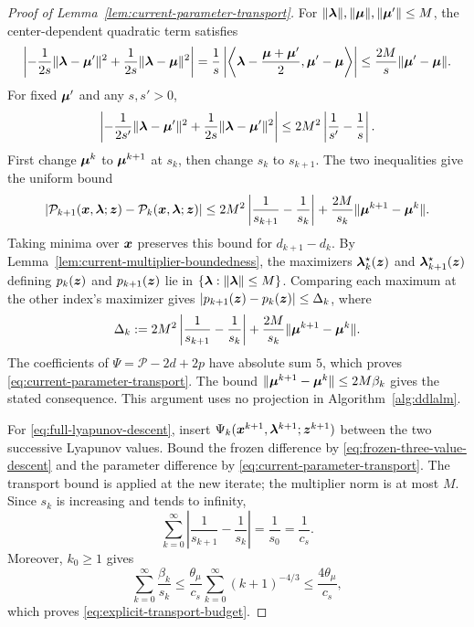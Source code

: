 \iffalse
\begin{proof}[Proof of Lemma~\ref{lem:current-parameter-transport}]
For $\|\bm{\lambda}\|,\|\bm{\mu}\|,\|\bm{\mu}'\|\le M$, the center-dependent
quadratic term satisfies
\[
\left|
-\frac1{2s}\|\bm{\lambda}-\bm{\mu}'\|^2
+\frac1{2s}\|\bm{\lambda}-\bm{\mu}\|^2
\right|
=\frac1s\left|
\left\langle\bm{\lambda}-\frac{\bm{\mu}+\bm{\mu}'}2,\bm{\mu}'-\bm{\mu}\right\rangle
\right|
\le\frac{2M}{s}\|\bm{\mu}'-\bm{\mu}\|.
\]
For fixed $\bm{\mu}'$ and any $s,s'>0$,
\[
\left|
-\frac1{2s'}\|\bm{\lambda}-\bm{\mu}'\|^2
+\frac1{2s}\|\bm{\lambda}-\bm{\mu}'\|^2
\right|
\le2M^2\left|\frac1{s'}-\frac1s\right|.
\]
First change $\bm{\mu}^k$ to $\bm{\mu}^{k+1}$ at $s_k$, then change $s_k$ to
$s_{k+1}$. The two inequalities give the uniform bound
\[
|\mathcal P_{k+1}(\bm{x},\bm{\lambda};\bm{z})-\mathcal P_k(\bm{x},\bm{\lambda};\bm{z})|
\le2M^2\left|\frac1{s_{k+1}}-\frac1{s_k}\right|
+\frac{2M}{s_k}\|\bm{\mu}^{k+1}-\bm{\mu}^k\|.
\]
Taking minima over $\bm{x}$ preserves this bound for $d_{k+1}-d_k$.
By Lemma~\ref{lem:current-multiplier-boundedness}, the maximizers
$\bm{\lambda}_k^\star(\bm{z})$ and $\bm{\lambda}_{k+1}^\star(\bm{z})$ defining
$p_k(\bm{z})$ and $p_{k+1}(\bm{z})$ lie in $\{\bm{\lambda}:\|\bm{\lambda}\|\le M\}$.
Comparing each maximum at the other index's maximizer gives
$|p_{k+1}(\bm{z})-p_k(\bm{z})|\le\Delta_k$, where
\[
\Delta_k:=2M^2\left|\frac1{s_{k+1}}-\frac1{s_k}\right|
+\frac{2M}{s_k}\|\bm{\mu}^{k+1}-\bm{\mu}^k\|.
\]
The coefficients of $\Psi=\mathcal P-2d+2p$ have absolute sum $5$,
which proves \eqref{eq:current-parameter-transport}.
The bound $\|\bm{\mu}^{k+1}-\bm{\mu}^k\|\le2M\beta_k$ gives the stated
consequence. This argument uses no projection in Algorithm~\ref{alg:ddlalm}.

For \eqref{eq:full-lyapunov-descent}, insert
$\Psi_k(\bm{x}^{k+1},\bm{\lambda}^{k+1};\bm{z}^{k+1})$ between the two
successive Lyapunov values. Bound the frozen difference by
\eqref{eq:frozen-three-value-descent} and the parameter difference by
\eqref{eq:current-parameter-transport}. The transport bound is applied
at the new iterate; the multiplier norm is at most $M$.
Since $s_k$ is increasing and tends to infinity,
\[
\sum_{k=0}^\infty\left|\frac1{s_{k+1}}-\frac1{s_k}\right|
=\frac1{s_0}=\frac1{c_s}.
\]
Moreover, $k_0\ge1$ gives
\[
\sum_{k=0}^\infty\frac{\beta_k}{s_k}
\le\frac{\theta_\mu}{c_s}
\sum_{k=0}^\infty(k+1)^{-4/3}
\le\frac{4\theta_\mu}{c_s},
\]
which proves \eqref{eq:explicit-transport-budget}.


\end{proof}
